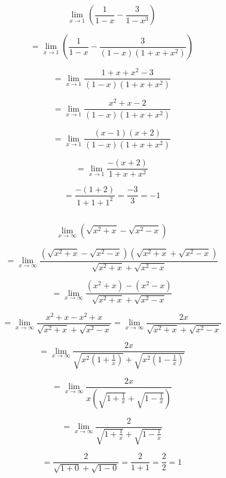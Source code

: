 \documentclass{article}
\begin{document}
	\section{}
	\subsection{}
	
	\[
	\lim_{x \to 1} \left( \frac{1}{1 - x} - \frac{3}{1 - x^3} \right)
	\]
	
	\[
	= \lim_{x \to 1} \left( \frac{1}{1 - x} - \frac{3}{(1 - x)(1 + x + x^2)} \right)
	\]
	
	\[
	= \lim_{x \to 1} \frac{1 + x + x^2 - 3}{(1 - x)(1 + x + x^2)}
	\]
	
	\[
	= \lim_{x \to 1} \frac{x^2 + x - 2}{(1 - x)(1 + x + x^2)}
	\]
	
	\[
	= \lim_{x \to 1} \frac{(x - 1)(x + 2)}{(1 - x)(1 + x + x^2)}
	\]
	
	\[
	= \lim_{x \to 1} \frac{-(x + 2)}{1 + x + x^2}
	\]
	
	\[
	= \frac{-(1 + 2)}{1 + 1 + 1^2} = \frac{-3}{3} = 	\boxed{-1}
	\]
	
	
	\subsection{}
	\[
	\lim_{x \to \infty} \left( \sqrt{x^2 + x} - \sqrt{x^2 - x} \right)
	\]
	
	\[
	= \lim_{x \to \infty} \frac{\left( \sqrt{x^2 + x} - \sqrt{x^2 - x} \right)\left( \sqrt{x^2 + x} + \sqrt{x^2 - x} \right)}{\sqrt{x^2 + x} + \sqrt{x^2 - x}}
	\]
	
	\[
	= \lim_{x \to \infty} \frac{(x^2 + x) - (x^2 - x)}{\sqrt{x^2 + x} + \sqrt{x^2 - x}}
	\]
	
	\[
	= \lim_{x \to \infty} \frac{x^2 + x - x^2 + x}{\sqrt{x^2 + x} + \sqrt{x^2 - x}} = \lim_{x \to \infty} \frac{2x}{\sqrt{x^2 + x} + \sqrt{x^2 - x}}
	\]
	
	\[
	= \lim_{x \to \infty} \frac{2x}{\sqrt{x^2(1 + \frac{1}{x})} + \sqrt{x^2(1 - \frac{1}{x})}}
	\]
	
	\[
	= \lim_{x \to \infty} \frac{2x}{x\left( \sqrt{1 + \frac{1}{x}} + \sqrt{1 - \frac{1}{x}} \right)}
	\]
	
	\[
	= \lim_{x \to \infty} \frac{2}{\sqrt{1 + \frac{1}{x}} + \sqrt{1 - \frac{1}{x}}}
	\]
	
	\[
	= \frac{2}{\sqrt{1 + 0} + \sqrt{1 - 0}} = \frac{2}{1 + 1} = \frac{2}{2} = \boxed{1}
	\]
	
	
	\section{}	
	
\end{document}
